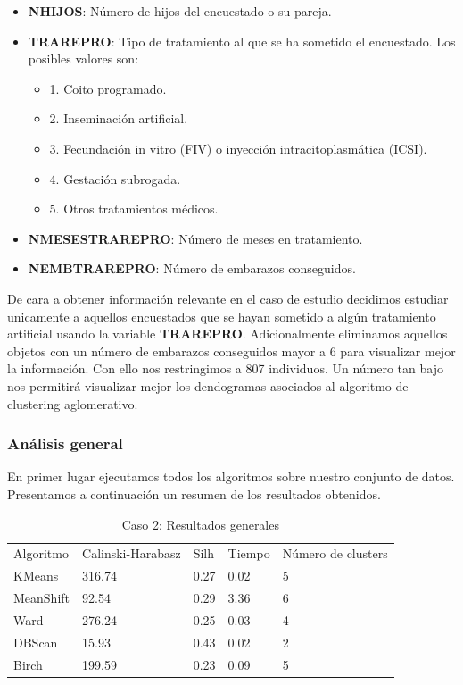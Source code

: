 \documentclass[11pt,a4paper]{article}
\begin{document}
	\begin{itemize}
		\item \textbf{NHIJOS}: Número de hijos del encuestado o su pareja.
		
		\item \textbf{TRAREPRO}: Tipo de tratamiento al que se ha sometido el encuestado. Los posibles valores son:
			\begin{itemize}
			\item 1. Coito programado.
			\item 2. Inseminación artificial.
			\item 3. Fecundación in vitro (FIV) o inyección intracitoplasmática (ICSI).
			\item 4. Gestación subrogada.
			\item 5. Otros tratamientos médicos.
		\end{itemize}
	
		\item \textbf{NMESESTRAREPRO}: Número de meses en tratamiento.
		
		\item \textbf{NEMBTRAREPRO}: Número de embarazos conseguidos.
	\end{itemize}
	
	De cara a obtener información relevante en el caso de estudio decidimos estudiar unicamente a aquellos encuestados que se hayan sometido a algún tratamiento artificial usando la variable \textbf{TRAREPRO}. Adicionalmente eliminamos aquellos objetos con un número de embarazos conseguidos mayor a 6 para visualizar mejor la información. Con ello nos restringimos a 807 individuos. Un número tan bajo nos permitirá visualizar mejor los dendogramas asociados al algoritmo de clustering aglomerativo. \\
	
	\subsubsection{Análisis general}
	
	En primer lugar ejecutamos todos los algoritmos sobre nuestro conjunto de datos. Presentamos a continuación un resumen de los resultados obtenidos. \\
	
	\begin{table}[H]
		\centering
		\caption{Caso 2: Resultados generales}
		\label{resultados2}
		\begin{tabular}{lllll}
			Algoritmo & Calinski-Harabasz & Silh & Tiempo & Número de clusters \\
			KMeans    & 316.74 & 0.27 & 0.02   & 5                   \\
			MeanShift & 92.54  & 0.29 & 3.36   & 6                   \\
			Ward      & 276.24 & 0.25 & 0.03   & 4                   \\
			DBScan    & 15.93  & 0.43 & 0.02   & 2                   \\
			Birch     & 199.59 & 0.23 & 0.09   & 5                  
		\end{tabular}
	\end{table}
	
\end{document}
